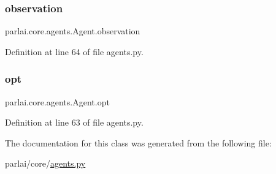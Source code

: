 \subsubsection{\texorpdfstring{observation}{observation}}
{\footnotesize\ttfamily parlai.\+core.\+agents.\+Agent.\+observation}



Definition at line 64 of file agents.\+py.

\mbox{\label{classparlai_1_1core_1_1agents_1_1Agent_ab3b45d2754244608c75d4068b90cd051}} 
\subsubsection{\texorpdfstring{opt}{opt}}
{\footnotesize\ttfamily parlai.\+core.\+agents.\+Agent.\+opt}



Definition at line 63 of file agents.\+py.



The documentation for this class was generated from the following file\+:\begin{DoxyCompactItemize}
\item 
parlai/core/\hyperlink{parlai_2core_2agents_8py}{agents.\+py}\end{DoxyCompactItemize}
